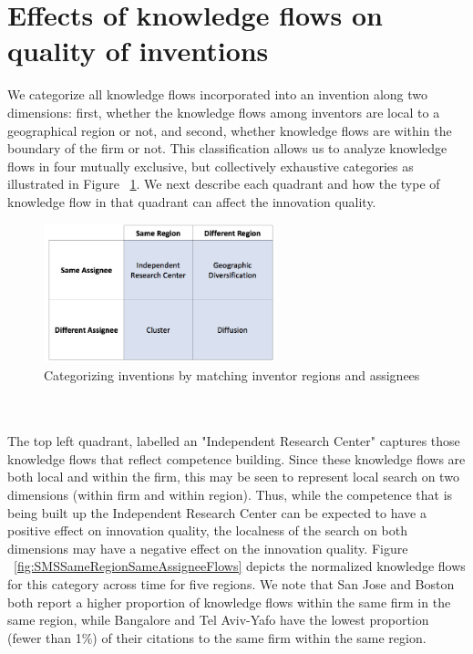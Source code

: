 \documentclass[10pt,letterpaper]{article}
\begin{document}
\section*{Effects of knowledge flows on quality of inventions}
We categorize all knowledge flows incorporated into an invention along two dimensions:  first, whether the knowledge flows among inventors are local to a geographical region or not, and second, whether knowledge flows are within the boundary of the firm or not. This classification allows us to analyze knowledge flows in four mutually exclusive, but collectively exhaustive categories as illustrated in Figure ~\ref{fig:2x2}. We next describe each quadrant and how the type of knowledge flow in that quadrant can affect the innovation quality.
\begin{figure}[h]
\begin{centering}
  \includegraphics[width=0.6\textwidth]{2x2}
  \caption{Categorizing inventions by matching inventor regions and assignees}
  \label{fig:2x2}
\end{centering}
\end{figure}
\\\\
The top left quadrant, labelled an "Independent Research Center" captures those knowledge flows that reflect competence building. Since these knowledge flows  are both local and within the firm, this may be seen to represent local search on two dimensions (within firm and within region).  Thus, while the competence that is being built up the Independent Research Center can be expected to have a positive effect on innovation quality, the localness of the search on both dimensions may have a negative effect on the innovation quality. Figure ~\ref{fig:SMSSameRegionSameAssigneeFlows} depicts the normalized knowledge flows for this category across time for five regions. We note that San Jose and Boston both report a higher proportion of knowledge flows within the same firm in the same region, while Bangalore and Tel Aviv-Yafo have the lowest proportion (fewer than 1\%) of their citations to the same firm within the same region.
\end{document}
